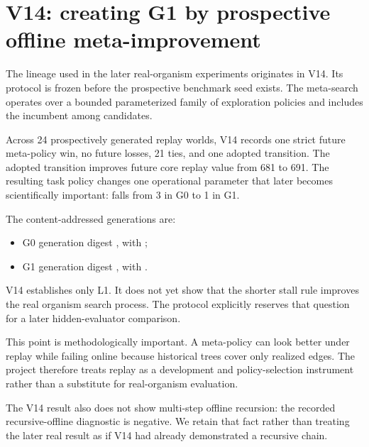 \section{V14: creating G1 by prospective offline meta-improvement}

The lineage used in the later real-organism experiments originates in V14. Its protocol is frozen before the prospective benchmark seed exists. The meta-search operates over a bounded parameterized family of exploration policies and includes the incumbent among candidates.

Across 24 prospectively generated replay worlds, V14 records one strict future meta-policy win, no future losses, 21 ties, and one adopted transition. The adopted transition improves future core replay value from 681 to 691. The resulting task policy changes one operational parameter that later becomes scientifically important:  falls from 3 in G0 to 1 in G1.

The content-addressed generations are:
\begin{itemize}
  \item G0 generation digest , with ;
  \item G1 generation digest , with .
\end{itemize}

V14 establishes only L1. It does not yet show that the shorter stall rule improves the real organism search process. The protocol explicitly reserves that question for a later hidden-evaluator comparison.

This point is methodologically important. A meta-policy can look better under replay while failing online because historical trees cover only realized edges. The project therefore treats replay as a development and policy-selection instrument rather than a substitute for real-organism evaluation.

The V14 result also does not show multi-step offline recursion: the recorded recursive-offline diagnostic is negative. We retain that fact rather than treating the later real result as if V14 had already demonstrated a recursive chain.

